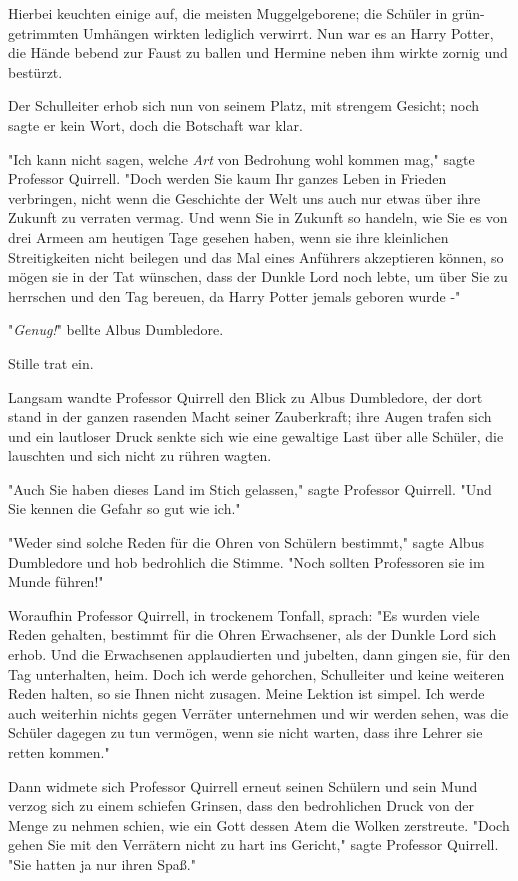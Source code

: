{Hierbei keuchten einige auf, die meisten Muggelgeborene; die Schüler in grün-getrimmten Umhängen wirkten lediglich verwirrt. Nun war es an Harry Potter, die Hände bebend zur Faust zu ballen und Hermine neben ihm wirkte zornig und bestürzt.

Der Schulleiter erhob sich nun von seinem Platz, mit strengem Gesicht; noch sagte er kein Wort, doch die Botschaft war klar.

"Ich kann nicht sagen, welche \emph{Art} von Bedrohung wohl kommen mag," sagte Professor Quirrell. "Doch werden Sie kaum Ihr ganzes Leben in Frieden verbringen, nicht wenn die Geschichte der Welt uns auch nur etwas über ihre Zukunft zu verraten vermag. Und wenn Sie in Zukunft so handeln, wie Sie es von drei Armeen am heutigen Tage gesehen haben, wenn sie ihre kleinlichen Streitigkeiten nicht beilegen und das Mal eines Anführers akzeptieren können, so mögen sie in der Tat wünschen, dass der Dunkle Lord noch lebte, um über Sie zu herrschen und den Tag bereuen, da Harry Potter jemals geboren wurde -"

"\emph{Genug!}" bellte Albus Dumbledore.

Stille trat ein.

Langsam wandte Professor Quirrell den Blick zu Albus Dumbledore, der dort stand in der ganzen rasenden Macht seiner Zauberkraft; ihre Augen trafen sich und ein lautloser Druck senkte sich wie eine gewaltige Last über alle Schüler, die lauschten und sich nicht zu rühren wagten.

"Auch Sie haben dieses Land im Stich gelassen," sagte Professor Quirrell. "Und Sie kennen die Gefahr so gut wie ich."

"Weder sind solche Reden für die Ohren von Schülern bestimmt," sagte Albus Dumbledore und hob bedrohlich die Stimme. "Noch sollten Professoren sie im Munde führen!"

Woraufhin Professor Quirrell, in trockenem Tonfall, sprach: "Es wurden viele Reden gehalten, bestimmt für die Ohren Erwachsener, als der Dunkle Lord sich erhob. Und die Erwachsenen applaudierten und jubelten, dann gingen sie, für den Tag unterhalten, heim. Doch ich werde gehorchen, Schulleiter und keine weiteren Reden halten, so sie Ihnen nicht zusagen. Meine Lektion ist simpel. Ich werde auch weiterhin nichts gegen Verräter unternehmen und wir werden sehen, was die Schüler dagegen zu tun vermögen, wenn sie nicht warten, dass ihre Lehrer sie retten kommen."

Dann widmete sich Professor Quirrell erneut seinen Schülern und sein Mund verzog sich zu einem schiefen Grinsen, dass den bedrohlichen Druck von der Menge zu nehmen schien, wie ein Gott dessen Atem die Wolken zerstreute. "Doch gehen Sie mit den Verrätern nicht zu hart ins Gericht," sagte Professor Quirrell. "Sie hatten ja nur ihren Spaß."

}
